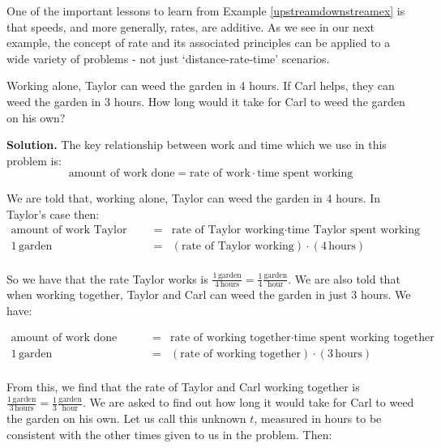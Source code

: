 One of the important lessons to learn from Example \ref{upstreamdownstreamex} is that speeds, and more generally, rates, are additive.  As we see in our next example, the concept of rate and its associated principles can be applied to a wide variety of problems - not just `distance-rate-time' scenarios.

\begin{ex} \label{workex}  Working alone, Taylor can weed the garden in 4 hours.  If Carl helps, they can weed the garden in 3 hours.  How long would it take for Carl to weed the garden on his own?

\smallskip

{\bf Solution.}  The key relationship between work and time which we use in this problem is: \[\text{amount of work done} = \text{rate of work} \cdot \text{time spent working} \]

We are told that, working alone, Taylor can weed the garden in 4 hours.  In Taylor's case then: \[ \begin{array}{rcl}

\text{amount of work Taylor does} & = & \text{rate of Taylor working} \cdot \text{time Taylor spent working} \\

1 \, \text{garden} & = & (\text{rate of Taylor working}) \cdot (4 \, \text{hours}) \\ \end{array} \]

So we have that the rate Taylor works is $\frac{1 \, \text{garden}}{ 4 \, \text{hours}} = \frac{1}{4} \frac{\text{garden}}{\text{hour}}$.    We are also told that when working together, Taylor and Carl can weed the garden in just 3 hours.  We have:

\[ \begin{array}{rcl}

\text{amount of work done together} & = & \text{rate of working together} \cdot \text{time spent working together} \\

1 \, \text{garden} & = & (\text{rate of working together}) \cdot (3 \, \text{hours}) \\ \end{array} \]

From this, we find that the rate of Taylor and Carl working together is $\frac{1 \, \text{garden}}{3 \, \text{hours}} = \frac{1}{3} \frac{\text{garden}}{\text{hour}}$.   We are asked to find out how long it would take for Carl to weed the garden on his own.  Let us call this unknown $t$, measured in hours to be consistent with the other times given to us in the problem. Then:


\end{ex}
